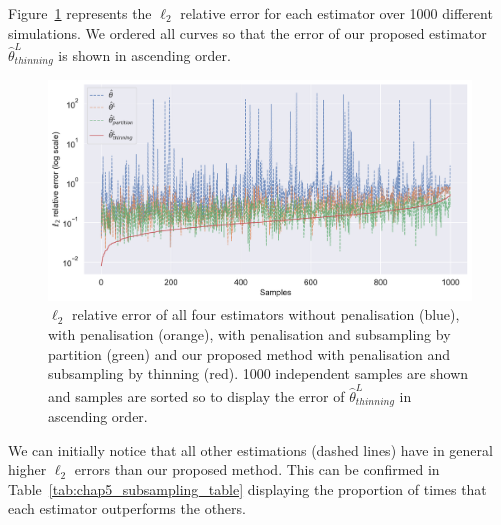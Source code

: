     Figure~\ref{fig:chap5_l2_error_subsampling} represents the $\ell_2$ relative error for each estimator over 1000 different simulations. 
    We ordered all curves so that the error of our proposed estimator $\hat \theta^L_{thinning}$ is shown in ascending order.

    \begin{figure}[!ht]
        \centering
        \includegraphics[width=1.0\textwidth]{images/chapter5/l2_error_subsampling.pdf} 
        \caption{$\ell_2$ relative error of all four estimators without penalisation (blue), with penalisation (orange), with penalisation and subsampling by partition (green) and our proposed method with penalisation and subsampling by thinning (red).
        1000 independent samples are shown and samples are sorted so to display the error of $\hat \theta^L_{thinning}$ in ascending order. 
        }
        \label{fig:chap5_l2_error_subsampling}
    \end{figure}

    We can initially notice that all other estimations (dashed lines) have in general higher $\ell_2$ errors than our proposed method.
    This can be confirmed in Table~\ref{tab:chap5_subsampling_table} displaying the proportion of times that each estimator outperforms the others.

